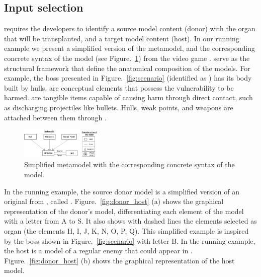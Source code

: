 \subsection{Input selection}

\ApproachName{} requires the developers to identify a source model content (donor) with the organ that will be transplanted, and a target model content (host). %
In our running example we present a simplified version of the metamodel, and the corresponding concrete syntax of the model (see Figure.~\ref{fig:metamodel+syntax}) from the video game \CaseStudy{}. 
 serve as the structural framework that define the anatomical composition of the models. For example, the boss presented in Figure.~\ref{fig:scenario} (identified as ) has its body built by hulls.
 are conceptual elements that possess the vulnerability to be harmed.
 are tangible items capable of causing harm through direct contact, such as discharging projectiles like bullets.
Hulls, weak points, and weapons are attached between them through .

\begin{figure}[tb]
    \centering
    \includegraphics[width=0.35\textwidth]{Figures/metamodel+syntax.png}
    \caption{Simplified metamodel with the corresponding concrete syntax of the model.}
    \label{fig:metamodel+syntax}
\end{figure}

In the running example, the source donor model is a simplified version of an original  from \CaseStudy{}, called . Figure.~\ref{fig:donor_host} (a) shows the graphical representation of the donor's model, differentiating each element of the model with a letter from A to S. It also shows with dashed lines the elements selected as organ (the elements H, I, J, K, N, O, P, Q).
This simplified example is inspired by the boss shown in Figure.~\ref{fig:scenario} with letter B. In the running example, the host is a model of a regular enemy that could appear in \CaseStudy{}. Figure.~\ref{fig:donor_host} (b) shows the graphical representation of the host model.

